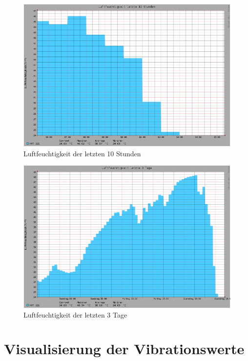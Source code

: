 \begin{figure}[!h] 
  \centering
     \includegraphics[scale=.3]{BilderAllgemein/Bilder/FeuchtigkeitTag.png}
  \caption{Luftfeuchtigkeit der letzten 10 Stunden}
\end{figure}

\begin{figure}[!h] 
  \centering
     \includegraphics[scale=.3]{BilderAllgemein/Bilder/Feuchtigkeit3Tage.png}
  \caption{Luftfeuchtigkeit der letzten 3 Tage}
\end{figure}\newpage


\section{Visualisierung der Vibrationswerte}
\label{Anhang_Visualisierung der Vibrationswerte}

